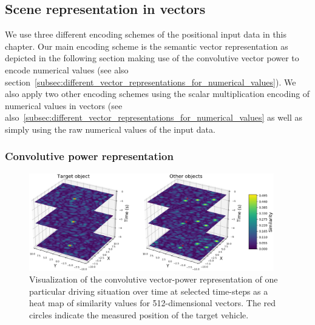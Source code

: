 \subsection{Scene representation in vectors}%
\label{subsec:scene_representation_in_vectors}

We use three different encoding schemes of the positional input data in this chapter.
Our main encoding scheme is the semantic vector representation as depicted in the following section making use of the convolutive vector power to encode numerical values (see also section~\ref{subsec:different_vector_representations_for_numerical_values}).
We also apply two other encoding schemes using the scalar multiplication encoding of numerical values in vectors (see also~\ref{subsec:different_vector_representations_for_numerical_values} as well as simply using the raw numerical values of the input data.

\subsubsection{Convolutive power representation}%
\label{ssubsec:convolutive_power_representation}

\begin{figure}[t!]
  \centering
  \includegraphics[width=0.95\textwidth]{imgs/spa_power_representation_in_time_viridis.eps}
  \caption{Visualization of the convolutive vector-power representation of one particular driving situation over time at selected time-steps as a heat map of similarity values for \num{512}-dimensional vectors. 
  The red circles indicate the measured position of the target vehicle.}
  \label{fig:spa_power}
\end{figure}

